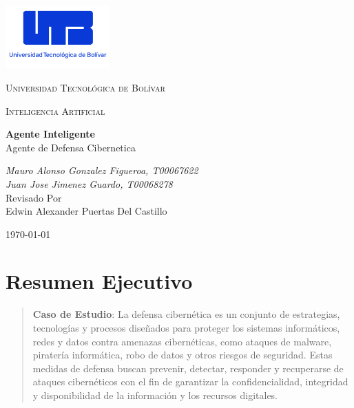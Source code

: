 \documentclass[letterpaper, 12pt]{report}
\begin{document}
\begin{titlepage}
      \centering
      \includegraphics[width=0.3\textwidth]{../../../images/logo_utb.png}\par\vspace{0.8cm}
      {\scshape\LARGE Universidad Tecnológica de Bolívar \par}
      \vspace{1cm}

      {\scshape\Large Inteligencia Artificial \par}
      \vspace{1cm}

      {\Large \bfseries Agente Inteligente\\}
      {\large Agente de Defensa Cibernetica}
      \vspace{2cm}

      {\itshape{} Mauro Alonso Gonzalez Figueroa, T00067622\/ \\}
      {\itshape{} Juan Jose Jimenez Guardo, T00068278\/ \\}
      \vfill
      Revisado Por\\
      Edwin Alexander Puertas Del Castillo\\
      {\large \today\par}
\end{titlepage}
\nocite{*}

\tableofcontents{}
\newpage

\section{Resumen Ejecutivo}

\begin{quote}
      \textbf{Caso de Estudio}: La defensa cibernética es un conjunto de estrategias, tecnologías y procesos
      diseñados para proteger los sistemas informáticos, redes y datos contra
      amenazas cibernéticas, como ataques de malware, piratería informática, robo de
      datos y otros riesgos de seguridad. Estas medidas de defensa buscan prevenir,
      detectar, responder y recuperarse de ataques cibernéticos con el fin de
      garantizar la confidencialidad, integridad y disponibilidad de la información y
      los recursos digitales.
\end{quote}
\end{document}
